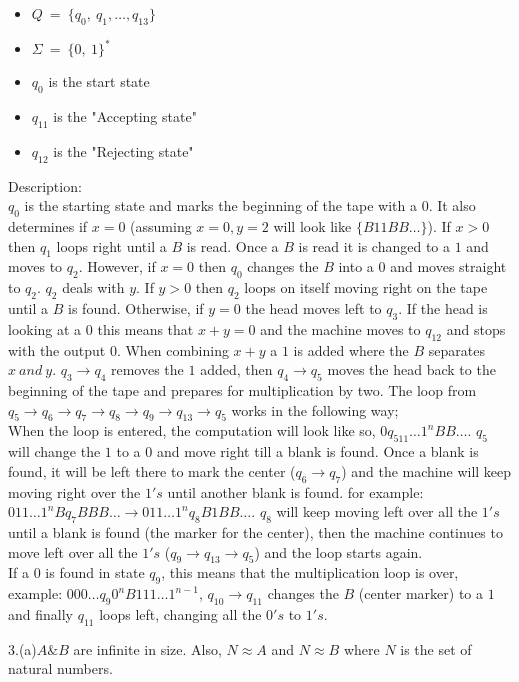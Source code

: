 \documentclass[a4paper,12pt]{article}
\begin{document}
\begin{itemize}
	\item $Q \: = \: \{ q_0, \: q_1, \dots , q_13 \}$ 
	\item $\Sigma \: = \: \{0,\: 1 \}^*$ 
	\item $q_0$ is the start state
	\item $q_{11}$ is the "Accepting state"
	\item $q_{12}$ is the "Rejecting state" 
\end{itemize}
Description: \\
$q_0$ is the starting state and marks the beginning of the tape with a $0$. It also determines if $x=0$ (assuming $x=0,y=2$ will look like $\{ B11BB \dots \}$). If $x > 0$ then $q_1$ loops right until a $B$ is read. Once a $B$ is read it is changed to a $1$ and moves to $q_2$. However, if $x=0$ then $q_0$ changes the $B$ into a $0$ and moves straight to $q_2$. $q_2$ deals with $y$. If $y>0$ then $q_2$ loops on itself moving right on the tape until a $B$ is found. Otherwise, if $y=0$ the head moves left to $q_3$. If the head is looking at a $0$ this means that $x+y=0$ and the machine moves to $q_{12}$ and stops with the output $0$. When combining $x+y$ a $1$ is added where the $B$ separates $x \: and \: y$. $q_3 \to q_4$ removes the $1$ added, then $q_4 \to q_5$ moves the head back to the beginning of the tape and prepares for multiplication by two. 
The loop from $q_5 \to q_6 \to q_7 \to q_8 \to q_9 \to q_{13} \to q_5$ works in the following way; \\
When the loop is entered, the computation will look like so, $0q_511 \dots 1^n BB \dots$. $q_5$ will change the $1$ to a $0$ and move right till a blank is found. Once a blank is found, it will be left there to mark the center ($q_6 \to q_7$) and the machine will keep moving right over the $1's$ until another blank is found. for example: 
$011 \dots 1^n Bq_7BBB \dots \to 011 \dots 1^n q_8B1BB \dots$. $q_8$ will keep moving left over all the $1's$ until a blank is found (the marker for the center), then the machine continues to move left over all the $1's$ ($q_9 \to q_{13} \to q_5$) and the loop starts again. \\
If a $0$ is found in state $q_9$, this means that the multiplication loop is over, example: $000 \dots q_9 0^nB111 \dots 1^{n-1}$, $q_{10} \to q_{11}$ changes the $B$ (center marker) to a $1$ and finally $q_{11}$ loops left, changing all the $0's$ to $1's$.

\newpage

3.(a)$A\&B$ are infinite in size. Also, $N\approx A$ and $N\approx B$ where $N$ is the set of natural numbers.\\ \\
\end{document}
